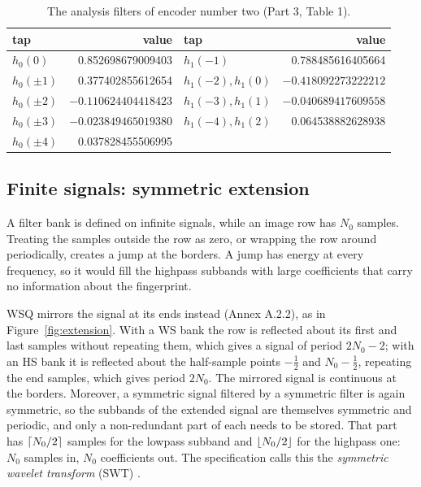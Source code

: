 \begin{table}[ht]
  \centering\small
  \begin{tabular}{@{}lr@{\qquad}lr@{}}
    \toprule
    tap & value & tap & value \\
    \midrule
    $h_0(0)$       &  0.852698679009403 & $h_1(-1)$       &  0.788485616405664 \\
    $h_0(\pm1)$    &  0.377402855612654 & $h_1(-2),h_1(0)$ & $-0.418092273222212$ \\
    $h_0(\pm2)$    & $-0.110624404418423$ & $h_1(-3),h_1(1)$ & $-0.040689417609558$ \\
    $h_0(\pm3)$    & $-0.023849465019380$ & $h_1(-4),h_1(2)$ &  0.064538882628938 \\
    $h_0(\pm4)$    &  0.037828455506995 & & \\
    \bottomrule
  \end{tabular}
  \caption{The analysis filters of encoder number two (Part 3, Table 1).}
  \label{tab:filters}
\end{table}

\subsection{Finite signals: symmetric extension}
\label{sec:extension}

A filter bank is defined on infinite signals, while an image row has $N_0$ samples. Treating
the samples outside the row as zero, or wrapping the row around periodically, creates a jump
at the borders. A jump has energy at every frequency, so it would fill the highpass subbands
with large coefficients that carry no information about the fingerprint.

WSQ mirrors the signal at its ends instead (Annex A.2.2), as in Figure~\ref{fig:extension}.
With a WS bank the row is reflected about its first and last samples without repeating them,
which gives a signal of period $2N_0-2$; with an HS bank it is reflected about the half-sample
points $-\tfrac12$ and $N_0-\tfrac12$, repeating the end samples, which gives period $2N_0$.
The mirrored signal is continuous at the borders. Moreover, a symmetric signal filtered by a
symmetric filter is again symmetric, so the subbands of the extended signal are themselves
symmetric and periodic, and only a non-redundant part of each needs to be stored. That part has
$\lceil N_0/2 \rceil$ samples for the lowpass subband and $\lfloor N_0/2 \rfloor$ for the highpass one:
$N_0$ samples in, $N_0$ coefficients out. The specification calls this the \emph{symmetric
wavelet transform} (SWT) \cite{brislawn1992}.

